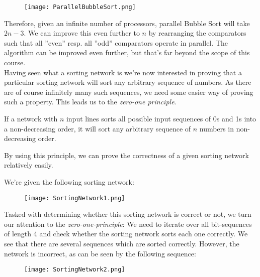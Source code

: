 \documentclass[main]{subfiles}
\begin{document}
\begin{figure}[H]
    \centering
    \texttt{[image: ParallelBubbleSort.png]}
\end{figure}
Therefore, given an infinite number of processors, parallel Bubble Sort will take $2n-3$. We can improve this even further to $n$ by rearranging the comparators such that all ''even'' resp. all ''odd'' comparators operate in parallel. The algorithm can be improved even further, but that's far beyond the scope of this course.\\[3mm]
Having seen what a sorting network is we're now interested in proving that a particular sorting network will sort any arbitrary sequence of numbers. As there are of course infinitely many such sequences, we need some easier way of proving such a property. This leads us to the \textit{zero-one principle}.
\begin{theorem}
    If a network with $n$ input lines sorts all possible input sequences of 0s and 1s into a non-decreasing order, it will sort any arbitrary sequence of $n$ numbers in non-decreasing order.
\end{theorem}
By using this principle, we can prove the correctness of a given sorting network relatively easily.
\newpage
\begin{example}
    We're given the following sorting network:
\begin{figure}[H]
    \centering
    \texttt{[image: SortingNetwork1.png]}
\end{figure}
\noindent Tasked with determining whether this sorting network is correct or not, we turn our attention to the \textit{zero-one-principle}: We need to iterate over all bit-sequences of length 4 and check whether the sorting network sorts each one correctly. We see that there are several sequences which are sorted correctly. However, the network is incorrect, as can be seen by the following sequence:
\begin{figure}[H]
    \centering
    \texttt{[image: SortingNetwork2.png]}
\end{figure}
\end{example}

\newpage
\end{document}
